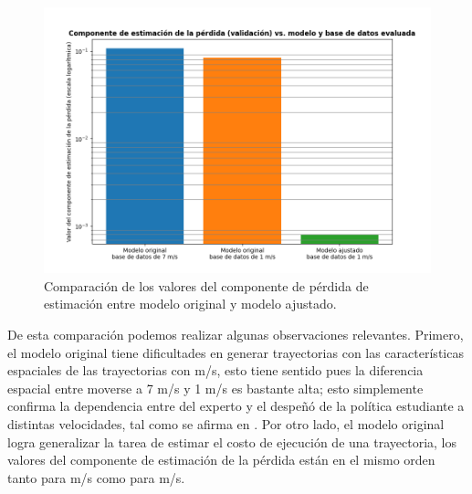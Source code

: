 \begin{figure}[H]
    \centering
    \includegraphics[scale=0.6]{partes/img/loss-estim-bars.png}
    \caption[Comparación de los valores del componente de pérdida de estimación entre modelo original y modelo ajustado.]{Comparación de los valores del componente de pérdida de estimación entre modelo original y modelo ajustado.}
    \label{fig:loss-estim-bars}
\end{figure}

De esta comparación podemos realizar algunas observaciones relevantes. Primero, el modelo original tiene dificultades en generar trayectorias con las características espaciales de las trayectorias con  m/s, esto tiene sentido pues la diferencia espacial entre moverse a 7 m/s y 1 m/s es bastante alta; esto simplemente confirma la dependencia entre  del experto y el despeñó de la política estudiante a distintas velocidades, tal como se afirma en \cite{Loquercio2021}. Por otro lado, el modelo original logra generalizar la tarea de estimar el costo de ejecución de una trayectoria, los valores del componente de estimación de la pérdida están en el mismo orden tanto para  m/s como para  m/s. 

